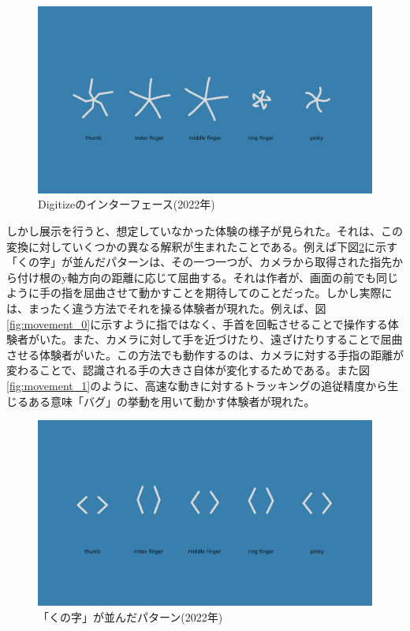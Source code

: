 \begin{figure}[H]
  \centering
  \includegraphics[width=15cm]{img/openhouse2022_interface.png}
  \caption{Digitizeのインターフェース(2022年)}
  \label{fig:exhibit_2022_interface}
\end{figure}

しかし展示を行うと、想定していなかった体験の様子が見られた。それは、この変換に対していくつかの異なる解釈が生まれたことである。例えば下図\ref{fig:exhibit_2022_kunoji}に示す「くの字」が並んだパターンは、その一つ一つが、カメラから取得された指先から付け根のy軸方向の距離に応じて屈曲する。それは作者が、画面の前でも同じように手の指を屈曲させて動かすことを期待してのことだった。しかし実際には、まったく違う方法でそれを操る体験者が現れた。例えば、図\ref{fig:movement_0}に示すように指ではなく、手首を回転させることで操作する体験者がいた。また、カメラに対して手を近づけたり、遠ざけたりすることで屈曲させる体験者がいた。この方法でも動作するのは、カメラに対する手指の距離が変わることで、認識される手の大きさ自体が変化するためである。また図\ref{fig:movement_1}のように、高速な動きに対するトラッキングの追従精度から生じるある意味「バグ」の挙動を用いて動かす体験者が現れた。

\begin{figure}[H]
  \centering
  \includegraphics[width=15cm]{img/kunoji_2022.png}
  \caption{「くの字」が並んだパターン(2022年)}
  \label{fig:exhibit_2022_kunoji}
\end{figure}

